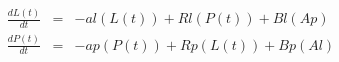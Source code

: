 
\begin{eqnarray*}
  \frac{dL(t)}{dt} &=& -al(L(t)) + Rl(P(t)) + Bl(Ap) \\
  \frac{dP(t)}{dt} &=& -ap(P(t)) + Rp(L(t)) + Bp(Al)
\end{eqnarray*}
